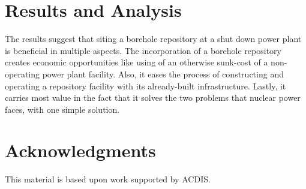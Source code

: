\documentclass{anstrans}
\begin{document}
\section{Results and Analysis}



The results suggest that siting a borehole repository at a shut down power 
plant is beneficial in multiple aspects. The incorporation of a borehole 
repository creates economic opportunities like using of an otherwise sunk-cost 
of a non-operating power 
plant facility. Also, it eases the process of constructing and operating a 
repository facility with its already-built infrastructure. Lastly, it carries 
most value in the fact that it solves the two problems that nuclear power 
faces, with one simple solution.

\section{Acknowledgments}

This material is based upon work supported by ACDIS.



\end{document}
